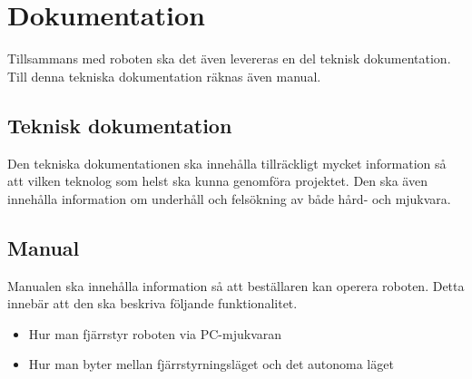 \section{Dokumentation}

Tillsammans med roboten ska det även levereras en del teknisk dokumentation.
Till denna tekniska dokumentation räknas även manual.

\subsection{Teknisk dokumentation}
Den tekniska dokumentationen ska innehålla tillräckligt mycket information så
att vilken teknolog som helst ska kunna genomföra projektet. Den ska även
innehålla information om underhåll och felsökning av både hård- och mjukvara.

\subsection{Manual}
Manualen ska innehålla information så att beställaren kan operera roboten.
Detta innebär att den ska beskriva följande funktionalitet.
\begin{itemize}
	\item Hur man fjärrstyr roboten via PC-mjukvaran
	\item Hur man byter mellan fjärrstyrningsläget och det autonoma läget
\end{itemize}
